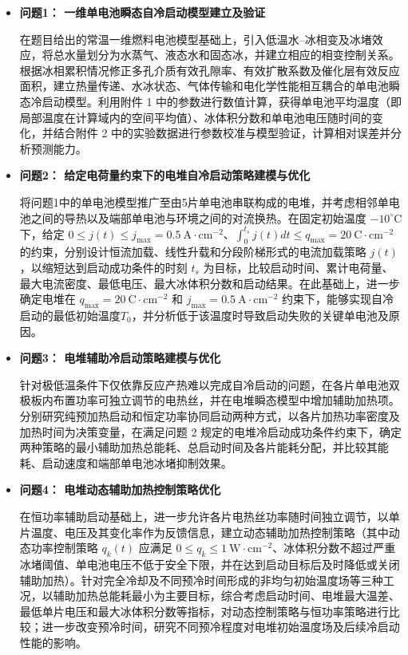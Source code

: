 \documentclass[bwprint]{gmcmthesis}
\numberwithin{figure}{section}
\begin{document}
\begin{itemize}
\renewcommand{\labelitemi}{$\blacktriangleright$}
\item \textbf {问题1： 一维单电池瞬态自冷启动模型建立及验证}

在题目给出的常温一维燃料电池模型基础上，引入低温水–冰相变及冰堵效应，将总水量划分为水蒸气、液态水和固态冰，并建立相应的相变控制关系。根据冰相累积情况修正多孔介质有效孔隙率、有效扩散系数及催化层有效反应面积，建立热量传递、水冰状态、气体传输和电化学性能相互耦合的单电池瞬态冷启动模型。利用附件 1 中的参数进行数值计算，获得单电池平均温度（即局部温度在计算域内的空间平均值）、冰体积分数和单电池电压随时间的变化，并结合附件 2 中的实验数据进行参数校准与模型验证，计算相对误差并分析预测能力。
\item \textbf {问题2： 给定电荷量约束下的电堆自冷启动策略建模与优化}

将问题1中的单电池模型推广至由5片单电池串联构成的电堆，并考虑相邻单电池之间的导热以及端部单电池与环境之间的对流换热。在固定初始温度 $-10^\circ\mathrm{C}$ 下，给定 $0 \leq j(t) \leq j_{\max} = 0.5 \ \mathrm{A}\cdot\mathrm{cm}^{-2}$、$\int_0^{t_s} j(t) dt \leq q_{\max} = 20 \ \mathrm{C}\cdot\mathrm{cm}^{-2}$ 的约束，分别设计恒流加载、线性升载和分段阶梯形式的电流加载策略 $j(t)$，以缩短达到启动成功条件的时刻 $t_s$ 为目标，比较启动时间、累计电荷量、最大电流密度、最低电压、最大冰体积分数和启动结果。在此基础上，进一步确定电堆在 $q_{\max} = 20\ \mathrm{C}\cdot\mathrm{cm}^{-2}$ 和 $j_{\max} = 0.5\ \mathrm{A}\cdot\mathrm{cm}^{-2}$ 约束下，能够实现自冷启动的最低初始温度$T_0$，并分析低于该温度时导致启动失败的关键单电池及原因。


\item \textbf {问题3： 电堆辅助冷启动策略建模与优化}

针对极低温条件下仅依靠反应产热难以完成自冷启动的问题，在各片单电池双极板内布置功率可独立调节的电热丝，并在电堆瞬态模型中增加辅助加热项。分别研究纯预加热启动和恒定功率协同启动两种方式，以各片加热功率密度及加热时间为决策变量，在满足问题 2 规定的电堆冷启动成功条件约束下，确定两种策略的最小辅助加热总能耗、总启动时间及各片能耗分配，并比较其能耗、启动速度和端部单电池冰堵抑制效果。
\item \textbf {问题4： 电堆动态辅助加热控制策略优化}

在恒功率辅助启动基础上，进一步允许各片电热丝功率随时间独立调节，以单片温度、电压及其变化率作为反馈信息，建立动态辅助加热控制策略（其中动态功率控制策略 $q_k(t)$ 应满足 $0 \leq q_k \leq 1 \ \mathrm{W} \cdot \mathrm{cm}^{-2}$、冰体积分数不超过严重冰堵阈值、单电池电压不低于安全下限，并在达到启动目标后及时降低或关闭辅助加热）。针对完全冷却及不同预冷时间形成的非均匀初始温度场等三种工况，以辅助加热总能耗最小为主要目标，综合考虑启动时间、电堆最大温差、最低单片电压和最大冰体积分数等指标，对动态控制策略与恒功率策略进行比较；进一步改变预冷时间，研究不同预冷程度对电堆初始温度场及后续冷启动性能的影响。
\end{itemize}
\end{document}
